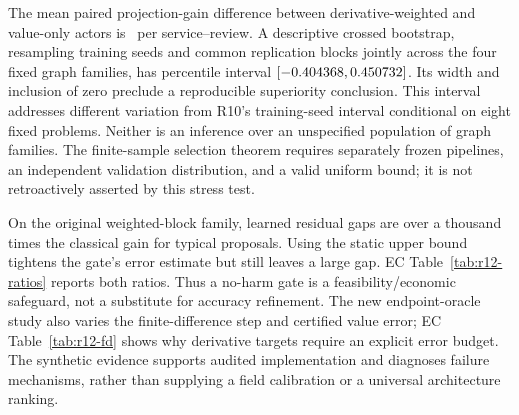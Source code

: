 The mean paired projection-gain difference between derivative-weighted and value-only actors is \RtwPairedMean\ per service--review. A descriptive crossed bootstrap, resampling training seeds and common replication blocks jointly across the four fixed graph families, has percentile interval $[-0.404368,0.450732]$. Its width and inclusion of zero preclude a reproducible superiority conclusion. This interval addresses different variation from R10's training-seed interval conditional on eight fixed problems. Neither is an inference over an unspecified population of graph families. The finite-sample selection theorem requires separately frozen pipelines, an independent validation distribution, and a valid uniform bound; it is not retroactively asserted by this stress test.

On the original weighted-block family, learned residual gaps are over a thousand times the classical gain for typical proposals. Using the static upper bound tightens the gate's error estimate but still leaves a large gap. EC Table~\ref{tab:r12-ratios} reports both ratios. Thus a no-harm gate is a feasibility/economic safeguard, not a substitute for accuracy refinement. The new endpoint-oracle study also varies the finite-difference step and certified value error; EC Table~\ref{tab:r12-fd} shows why derivative targets require an explicit error budget. The synthetic evidence supports audited implementation and diagnoses failure mechanisms, rather than supplying a field calibration or a universal architecture ranking.

